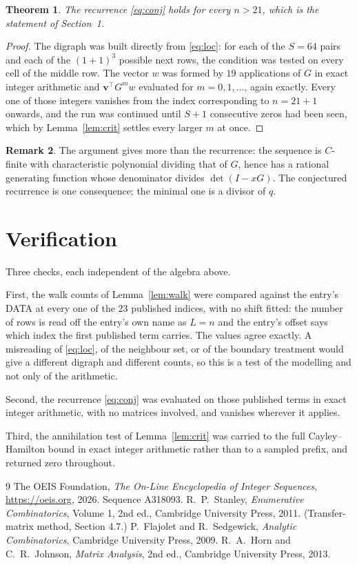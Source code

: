 \documentclass[11pt,a4paper]{article}
\theoremstyle{plain}
\newtheorem{theorem}{Theorem}
\theoremstyle{definition}
\newtheorem{remark}[theorem]{Remark}
\begin{document}
\begin{theorem}
The recurrence \eqref{eq:conj} holds for every $n>21$, which is the statement of
Section~1.
\end{theorem}

\begin{proof}
The digraph was built directly from \eqref{eq:loc}: for each of the $S=64$ pairs and each
of the $(1+1)^{3}$ possible next rows, the condition was tested on every cell of
the middle row. The vector $w$ was formed by $19$ applications of $G$ in exact integer
arithmetic and $\mathbf{v}^{\!\top}G^{m}w$ evaluated for $m=0,1,\dots$, again exactly.
Every one of those integers vanishes from the index corresponding to $n=21+1$ onwards,
and the run was continued until $S+1$ consecutive zeros had been seen, which by
Lemma~\ref{lem:crit} settles every larger $m$ at once.
\end{proof}

\begin{remark}
The argument gives more than the recurrence: the sequence is $C$-finite with characteristic
polynomial dividing that of $G$, hence has a rational generating function whose denominator
divides $\det(I-xG)$. The conjectured recurrence is one consequence; the minimal one is a
divisor of $q$.
\end{remark}

\section{Verification}

Three checks, each independent of the algebra above.

First, the walk counts of Lemma~\ref{lem:walk} were compared against the entry's DATA at
every one of the $23$ published indices, with no shift fitted: the number of rows is
read off the entry's own name as $L=n$ and the entry's offset says which index the first
published term carries. The values agree exactly. A misreading of \eqref{eq:loc}, of the
neighbour set, or of the boundary treatment would give a different digraph and different
counts, so this is a test of the modelling and not only of the arithmetic.

Second, the recurrence \eqref{eq:conj} was evaluated on those published terms in exact
integer arithmetic, with no matrices involved, and vanishes wherever it applies.

Third, the annihilation test of Lemma~\ref{lem:crit} was carried to the full
Cayley--Hamilton bound in exact integer arithmetic rather than to a sampled prefix, and
returned zero throughout.

\begin{thebibliography}{9}
 The OEIS Foundation, \emph{The On-Line Encyclopedia of Integer
Sequences}, \url{https://oeis.org}, 2026. Sequence A318093.
 R.~P.~Stanley, \emph{Enumerative Combinatorics}, Volume 1, 2nd ed.,
Cambridge University Press, 2011. (Transfer-matrix method, Section 4.7.)
 P.~Flajolet and R.~Sedgewick, \emph{Analytic Combinatorics}, Cambridge
University Press, 2009.
 R.~A.~Horn and C.~R.~Johnson, \emph{Matrix Analysis}, 2nd ed., Cambridge
University Press, 2013.
\end{thebibliography}
\end{document}
